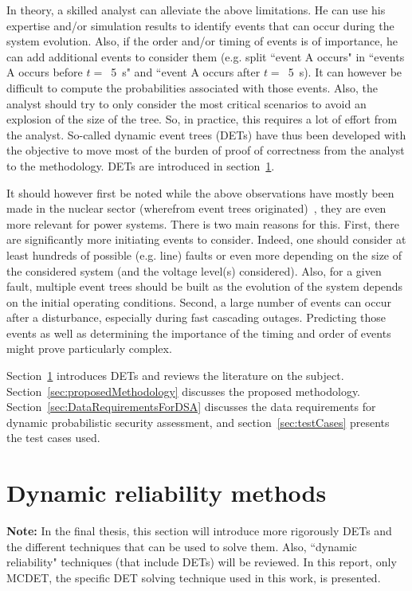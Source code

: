 In theory, a skilled analyst can alleviate the above limitations. He can use his expertise and/or simulation results to identify events that can occur during the system evolution. Also, if the order and/or timing of events is of importance, he can add additional events to consider them (e.g. split ``event A occurs" in ``events A occurs before \(t=\)~5~s" and ``event A occurs after \(t=\)~5~s). It can however be difficult to compute the probabilities associated with those events. Also, the analyst should try to only consider the most critical scenarios to avoid an explosion of the size of the tree. So, in practice, this requires a lot of effort from the analyst. So-called dynamic event trees (DETs) have thus been developed with the objective to move most of the burden of proof of correctness from the analyst to the methodology. DETs are introduced in section~\ref{sec:dynamicReliability}.

It should however first be noted while the above observations have mostly been made in the nuclear sector (wherefrom event trees originated)~\cite{LabeauTowards}, they are even more relevant for power systems. There is two main reasons for this. First, there are significantly more initiating events to consider. Indeed, one should consider at least hundreds of possible (e.g. line) faults or even more depending on the size of the considered system (and the voltage level(s) considered). Also, for a given fault, multiple event trees should be built as the evolution of the system depends on the initial operating conditions. Second, a large number of events can occur after a disturbance, especially during fast cascading outages. Predicting those events as well as determining the importance of the timing and order of events might prove particularly complex.

Section~\ref{sec:dynamicReliability} introduces DETs and reviews the literature on the subject. Section~\ref{sec:proposedMethodology} discusses the proposed methodology. Section~\ref{sec:DataRequirementsForDSA} discusses the data requirements for dynamic probabilistic security assessment, and section~\ref{sec:testCases} presents the test cases used.


\section{Dynamic reliability methods}
\label{sec:dynamicReliability}

\textbf{Note:} In the final thesis, this section will introduce more rigorously DETs and the different techniques that can be used to solve them. Also, ``dynamic reliability" techniques (that include DETs) will be reviewed. In this report, only MCDET, the specific DET solving technique used in this work, is presented.

